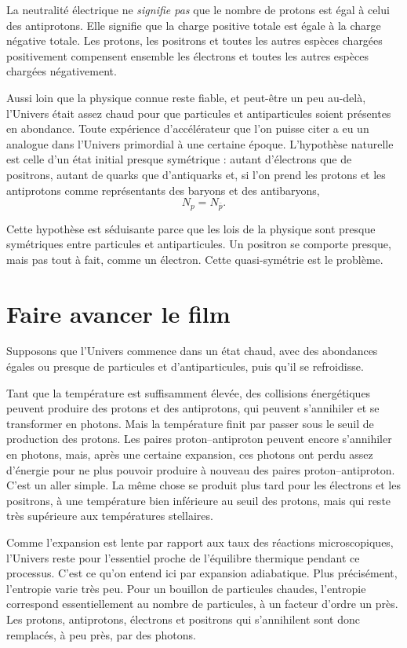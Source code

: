 La neutralité électrique ne \emph{signifie pas} que le nombre de protons est égal à celui des antiprotons. Elle signifie que la charge positive totale est égale à la charge négative totale. Les protons, les positrons et toutes les autres espèces chargées positivement compensent ensemble les électrons et toutes les autres espèces chargées négativement.

Aussi loin que la physique connue reste fiable, et peut-être un peu au-delà, l’Univers était assez chaud pour que particules et antiparticules soient présentes en abondance. Toute expérience d’accélérateur que l’on puisse citer a eu un analogue dans l’Univers primordial à une certaine époque. L’hypothèse naturelle est celle d’un état initial presque symétrique : autant d’électrons que de positrons, autant de quarks que d’antiquarks et, si l’on prend les protons et les antiprotons comme représentants des baryons et des antibaryons,
\[
N_p = N_{\bar p}.
\]

Cette hypothèse est séduisante parce que les lois de la physique sont presque symétriques entre particules et antiparticules. Un positron se comporte presque, mais pas tout à fait, comme un électron. Cette quasi-symétrie est le problème.

\section{Faire avancer le film}

Supposons que l’Univers commence dans un état chaud, avec des abondances égales ou presque de particules et d’antiparticules, puis qu’il se refroidisse.

Tant que la température est suffisamment élevée, des collisions énergétiques peuvent produire des protons et des antiprotons, qui peuvent s’annihiler et se transformer en photons. Mais la température finit par passer sous le seuil de production des protons. Les paires proton--antiproton peuvent encore s’annihiler en photons, mais, après une certaine expansion, ces photons ont perdu assez d’énergie pour ne plus pouvoir produire à nouveau des paires proton--antiproton. C’est un aller simple. La même chose se produit plus tard pour les électrons et les positrons, à une température bien inférieure au seuil des protons, mais qui reste très supérieure aux températures stellaires.

Comme l’expansion est lente par rapport aux taux des réactions microscopiques, l’Univers reste pour l’essentiel proche de l’équilibre thermique pendant ce processus. C’est ce qu’on entend ici par expansion adiabatique. Plus précisément, l’entropie varie très peu. Pour un bouillon de particules chaudes, l’entropie correspond essentiellement au nombre de particules, à un facteur d’ordre un près. Les protons, antiprotons, électrons et positrons qui s’annihilent sont donc remplacés, à peu près, par des photons.

